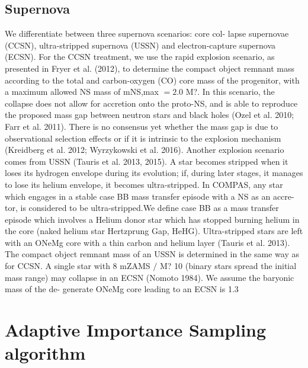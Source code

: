 \subsection{Supernova}
We differentiate between three supernova scenarios: core col- lapse supernovae (CCSN), ultra-stripped supernova (USSN) and electron-capture supernova (ECSN). For the CCSN treatment, we use the rapid explosion
scenario, as presented in Fryer et al. (2012), to determine the compact object remnant mass according to the total and carbon-oxygen (CO) core mass of the progenitor, with
a maximum allowed NS mass of mNS,max $= 2.0$ M?. In this scenario, the collapse does not allow for accretion onto the proto-NS, and is able to reproduce the proposed mass gap between neutron stars and black holes (Ozel et al. 2010;
Farr et al. 2011). There is no consensus yet whether the mass gap is due to observational selection effects or if it is intrinsic to the explosion mechanism (Kreidberg et al. 2012; Wyrzykowski et al. 2016). Another explosion scenario comes from USSN (Tauris
et al. 2013, 2015). A star becomes stripped when it loses its hydrogen envelope during its evolution; if, during later stages, it manages to lose its helium envelope, it becomes ultra-stripped. In COMPAS, any star which engages in a stable case BB mass transfer episode with a NS as an accre- tor, is considered to be ultra-stripped.We define case BB as a mass transfer episode which involves a Helium donor star which has stopped burning helium in the core (naked helium star Hertzprung Gap, HeHG). Ultra-stripped stars are left with an ONeMg core with a thin carbon and helium layer (Tauris et al. 2013). The compact object remnant mass of an USSN is determined in the same way as for CCSN. A single star with 8  mZAMS $/$ M?  10 (binary stars spread the initial mass range) may collapse in an ECSN (Nomoto 1984). We assume the baryonic mass of the de- generate ONeMg core leading to an ECSN is 1.3


\section{Adaptive Importance Sampling algorithm}




